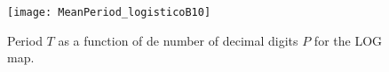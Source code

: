 %
%
\center
\begin{figure}
\texttt{[image: MeanPeriod\_logisticoB10]}
\caption{Period $T$ as a function of de number of decimal digits $P$ for the LOG map.} \label{fig:perio}
\end{figure}



